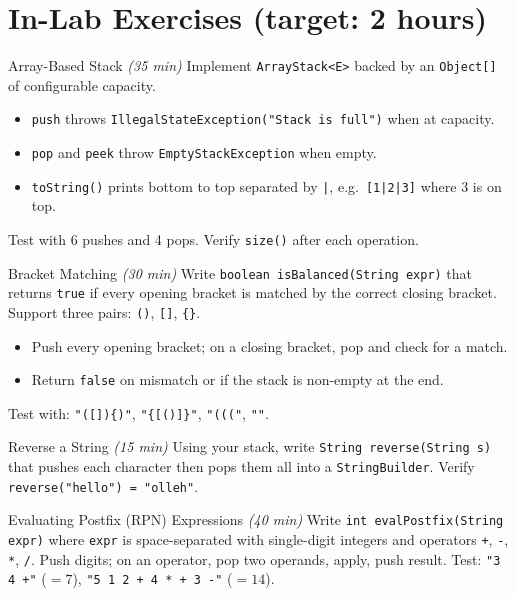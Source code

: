 \documentclass[11pt]{article}
\begin{document}
\section*{In-Lab Exercises (target: 2 hours)}

\begin{labexercise}{Array-Based Stack \hfill {\small \itshape (35 min)}}
Implement \texttt{ArrayStack<E>} backed by an \texttt{Object[]} of configurable capacity.
\begin{itemize}[leftmargin=*,nosep]
  \item \texttt{push} throws \texttt{IllegalStateException("Stack is full")} when at capacity.
  \item \texttt{pop} and \texttt{peek} throw \texttt{EmptyStackException} when empty.
  \item \texttt{toString()} prints bottom to top separated by \texttt{|}, e.g.\ \texttt{[1|2|3]} where 3 is on top.
\end{itemize}
Test with 6 pushes and 4 pops. Verify \texttt{size()} after each operation.
\end{labexercise}

\begin{labexercise}{Bracket Matching \hfill {\small \itshape (30 min)}}
Write \texttt{boolean isBalanced(String expr)} that returns \texttt{true} if every opening
bracket is matched by the correct closing bracket.
Support three pairs: \texttt{()}, \texttt{[]}, \texttt{\{\}}.
\begin{itemize}[leftmargin=*,nosep]
  \item Push every opening bracket; on a closing bracket, pop and check for a match.
  \item Return \texttt{false} on mismatch or if the stack is non-empty at the end.
\end{itemize}
Test with: \texttt{"([])\{)"}, \texttt{"\{[()]\}"}, \texttt{"((("}, \texttt{""}.
\end{labexercise}

\begin{labexercise}{Reverse a String \hfill {\small \itshape (15 min)}}
Using your stack, write \texttt{String reverse(String s)} that pushes each character
then pops them all into a \texttt{StringBuilder}.
Verify \texttt{reverse("hello") = "olleh"}.
\end{labexercise}

\begin{labexercise}{Evaluating Postfix (RPN) Expressions \hfill {\small \itshape (40 min)}}
Write \texttt{int evalPostfix(String expr)} where \texttt{expr} is space-separated with
single-digit integers and operators \texttt{+}, \texttt{-}, \texttt{*}, \texttt{/}.
Push digits; on an operator, pop two operands, apply, push result.
Test: \texttt{"3 4 +"} ($= 7$), \texttt{"5 1 2 + 4 * + 3 -"} ($= 14$).
\end{labexercise}
\end{document}
